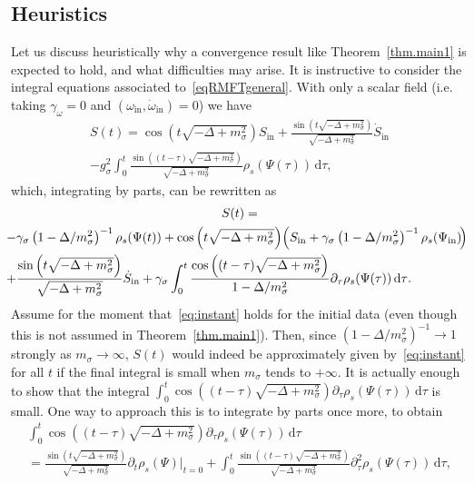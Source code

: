 \documentclass[10pt]{amsart}
\theoremstyle{definition}\newtheorem{defi}[theo]{Definition}\newtheorem{rema}[theo]{Remark}\newtheorem{exam}[theo]{Example}\newtheorem{exem}[theo]{Example}\newtheorem{nota}[theo]{Notation}
\newcommand{\rmin}{\mathrm{in}}
\renewcommand\d[1]{{\ensuremath{\,\text{d}#1}}}
\begin{document}
\subsection{Heuristics}\label{sec:heuristics}

Let us discuss heuristically why a convergence result like Theorem~\ref{thm.main1} is expected to hold, and what difficulties may arise. It is instructive to consider the integral equations associated to~\eqref{eqRMFTgeneral}. With only a scalar field (i.e. taking $\gamma_\omega = 0$ and $(\omega_\rmin,\dot\omega_\rmin)=0$) we have
\begin{multline}
S(t)=\cos \left(t\sqrt{-\Delta+m_\sigma^2}\right)S_\rmin+\frac{\sin \left(t\sqrt{-\Delta+m_\sigma^2}\right)}{\sqrt{-\Delta+m_\sigma^2}}\dot{S}_\rmin\\
 -g_\sigma^2\int_0^t\frac{\sin\left((t-\tau)\sqrt{-\Delta+m_\sigma^2}\right)}{\sqrt{-\Delta+m_\sigma^2}}\rho_s(\Psi(\tau))\d \tau,
\end{multline}
which, integrating by parts, can be rewritten as
\begin{multline*}
S(t)=\\
\mkern-8mu{\begin{aligned}
-&\gamma_\sigma\left(1-\Delta/m_\sigma^2\right)^{-1}\rho_s(\Psi(t))+\cos \left(t\sqrt{-\Delta+m_\sigma^2}\right)\!\left(S_\rmin+\gamma_\sigma\left(1-\Delta/m_\sigma^2\right)^{-1}\rho_s(\Psi_\rmin)\!\right)\\
+&\frac{\sin \left(t\sqrt{-\Delta+m_\sigma^2}\right)}{\sqrt{-\Delta+m_\sigma^2}}\dot{S}_\rmin +\gamma_\sigma\int_0^t\frac{\cos \left((t-\tau)\sqrt{-\Delta+m_\sigma^2}\right)}{1-\Delta/m_\sigma^2}\partial_\tau\rho_s(\Psi(\tau))\d \tau.
\end{aligned}}
\end{multline*}
Assume for the moment that~\eqref{eq:instant} holds for the initial data (even though this is not assumed in Theorem~\ref{thm.main1}). Then, since $(1-\Delta/m_\sigma^2)^{-1}\to 1$ strongly as $m_\sigma\to \infty$, $S(t)$ would indeed be approximately given by~\eqref{eq:instant} for all $t$ if the final integral is small when $m_\sigma$ tends to $+\infty$. It is actually enough to show that the integral $\int_0^t\cos ((t-\tau)\sqrt{-\Delta+m_\sigma^2})\partial_\tau\rho_s(\Psi(\tau))\d \tau$ is small. One way to approach this is to integrate by parts once more, to obtain
\begin{multline}
\int_0^t\cos \left((t-\tau)\sqrt{-\Delta+m_\sigma^2}\right)\partial_\tau\rho_s(\Psi(\tau))\d \tau\\ =\frac{\sin\left(t\sqrt{-\Delta+m_\sigma^2}\right)}{\sqrt{-\Delta+m_\sigma^2}}\partial_t\rho_s(\Psi)\vert_{t=0}
+\int_0^t\frac{\sin \left((t-\tau)\sqrt{-\Delta+m_\sigma^2}\right)}{\sqrt{-\Delta+m_\sigma^2}}\partial_\tau^2\rho_s(\Psi(\tau))\d \tau,
\end{multline}
\end{document}

